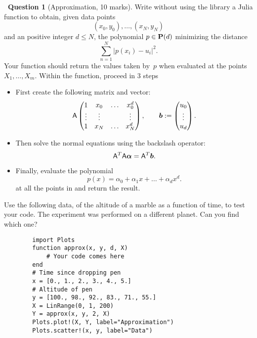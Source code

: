 \documentclass[11pt]{article}
\theoremstyle{definition}
\newtheorem{compexercise}{{\normalfont \faLaptop}~Question}
\begin{document}
\newpage
\begin{compexercise}
    [Approximation, 10 marks]
    Write without using the  library a Julia function  to obtain,
    given data points
    \[
        (x_0, y_0), \dotsc, (x_N, y_N)
    \]
    and an positive integer $d \leq N$,
    the polynomial $p \in \mathbf P(d)$ minimizing the distance
    \[
        \sum_{n=1}^{N} \bigl\lvert p(x_i) - u_i \bigr\rvert^2.
    \]
    Your function should return the values taken by~$p$
    when evaluated at the points $X_1, \dotsc, X_m$.
    Within the function, proceed in 3 steps
    \begin{itemize}
        \item
            First create the following matrix and vector:
            \[
                \mathsf A
                \begin{pmatrix}
                    1 & x_0 & \hdots & x_0^d \\
                    \vdots & \vdots & & \vdots \\
                    1 & x_{N} & \hdots & x_N^d
                \end{pmatrix},
                \qquad
                \mathbf{\boldsymbol{b}} :=
                \begin{pmatrix}
                    u_0 \\
                    \vdots \\
                    u_d
                \end{pmatrix}.
            \]
            \item
                Then solve the normal equations using the backslash operator:
                \begin{equation}
                    \label{eq:normal_equations}
                    \mathsf A^T \mathsf A \mathbf{\boldsymbol{\alpha}} = \mathsf A^T \mathbf{\boldsymbol{b}}.
                \end{equation}

            \item
                Finally, evaluate the polynomial
                \[
                    p(x) = \alpha_0 + \alpha_1 x + \dotsc + \alpha_d x^d.
                \]
                at all the points in  and return the result.
    \end{itemize}
    Use the following data,
    of the altitude of a marble as a function of time,
    to test your code.
    The experiment was performed on a different planet.
    Can you find which one?

    \begin{verbatim}
        import Plots
        function approx(x, y, d, X)
            # Your code comes here
        end
        # Time since dropping pen
        x = [0., 1., 2., 3., 4., 5.]
        # Altitude of pen
        y = [100., 98., 92., 83., 71., 55.]
        X = LinRange(0, 1, 200)
        Y = approx(x, y, 2, X)
        Plots.plot!(X, Y, label="Approximation")
        Plots.scatter!(x, y, label="Data")
    \end{verbatim}
\end{compexercise}
\end{document}
